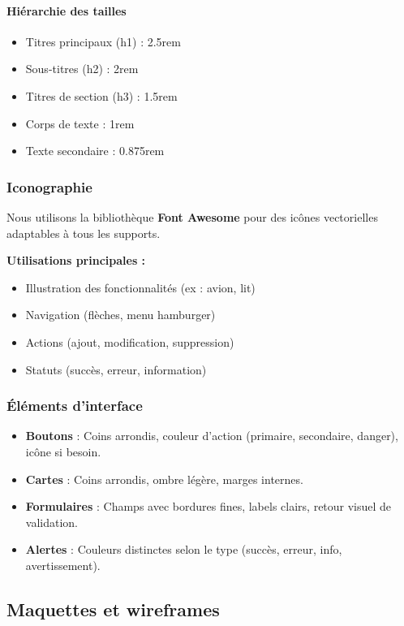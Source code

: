\documentclass[a4paper,12pt]{article}
\begin{document}
\paragraph{Hiérarchie des tailles}
\begin{itemize}
  \item Titres principaux (h1) : 2.5rem
  \item Sous-titres (h2) : 2rem
  \item Titres de section (h3) : 1.5rem
  \item Corps de texte : 1rem
  \item Texte secondaire : 0.875rem
\end{itemize}

\subsubsection{Iconographie}
Nous utilisons la bibliothèque \textbf{Font Awesome} pour des icônes vectorielles adaptables à tous les supports.

\textbf{Utilisations principales :}
\begin{itemize}
  \item Illustration des fonctionnalités (ex : avion, lit)
  \item Navigation (flèches, menu hamburger)
  \item Actions (ajout, modification, suppression)
  \item Statuts (succès, erreur, information)
\end{itemize}

\subsubsection{Éléments d’interface}
\begin{itemize}
  \item \textbf{Boutons} : Coins arrondis, couleur d’action (primaire, secondaire, danger), icône si besoin.
  \item \textbf{Cartes} : Coins arrondis, ombre légère, marges internes.
  \item \textbf{Formulaires} : Champs avec bordures fines, labels clairs, retour visuel de validation.
  \item \textbf{Alertes} : Couleurs distinctes selon le type (succès, erreur, info, avertissement).
\end{itemize}
\subsection{Maquettes et wireframes}
\end{document}
